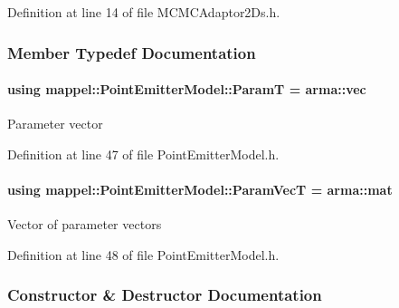 Definition at line 14 of file M\+C\+M\+C\+Adaptor2\+Ds.\+h.



\subsubsection{Member Typedef Documentation}
\paragraph[{\texorpdfstring{ParamT}{ParamT}}]{\setlength{\rightskip}{0pt plus 5cm}using {\bf mappel\+::\+Point\+Emitter\+Model\+::\+ParamT} =  arma\+::vec\hspace{0.3cm}{\ttfamily [inherited]}}\hypertarget{classmappel_1_1PointEmitterModel_a665ec6aea3aac139bb69a23c06d4b9a1}{}\label{classmappel_1_1PointEmitterModel_a665ec6aea3aac139bb69a23c06d4b9a1}
Parameter vector 

Definition at line 47 of file Point\+Emitter\+Model.\+h.

\paragraph[{\texorpdfstring{Param\+VecT}{ParamVecT}}]{\setlength{\rightskip}{0pt plus 5cm}using {\bf mappel\+::\+Point\+Emitter\+Model\+::\+Param\+VecT} =  arma\+::mat\hspace{0.3cm}{\ttfamily [inherited]}}\hypertarget{classmappel_1_1PointEmitterModel_add253b568d763f1513a810aac35de719}{}\label{classmappel_1_1PointEmitterModel_add253b568d763f1513a810aac35de719}
Vector of parameter vectors 

Definition at line 48 of file Point\+Emitter\+Model.\+h.



\subsubsection{Constructor \& Destructor Documentation}
